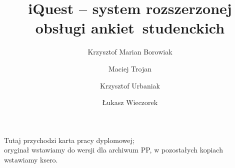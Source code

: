 \documentclass[polish,bachelor,a4paper,oneside]{ppfcmthesis}
\author{%
   Krzysztof Marian Borowiak \album{94269} \and 
   Maciej Trojan \album{94378} \and 
   Krzysztof Urbaniak \album{94381} \and 
   Łukasz Wieczorek \album{94385}}
\title{iQuest -- system rozszerzonej obsługi ankiet~studenckich}                   %
\begin{document}
\frontmatter\pagestyle{empty}%
\maketitle\cleardoublepage%

\thispagestyle{empty}\vspace*{\fill}%
\begin{center}Tutaj przychodzi karta pracy dyplomowej;\\oryginał wstawiamy do wersji dla archiwum PP, w pozostałych kopiach wstawiamy ksero.\end{center}%
\vfill\cleardoublepage%

\pagestyle{ppfcmthesis}%
\tableofcontents* \cleardoublepage%

\mainmatter%










\cleardoublepage\appendix%


%

{\raggedright\sloppy\small}

\ppcolophon
\end{document}
